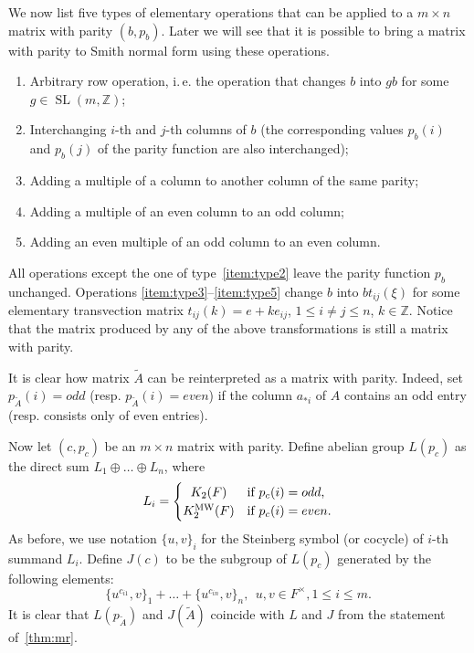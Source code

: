 \documentclass[oneside, 10pt]{amsart}
\theoremstyle{plain}
\theoremstyle{remark}
\theoremstyle{definition}
\DeclareMathOperator{\SL}{SL}
\newcommand{\ZZ}{\mathbb{Z}}
\newcommand{\K}{K_2}
\newcommand{\Kmw}{K^{\mathrm{MW}}_2}
\begin{document}
We now list five types of elementary operations that can be applied to a $m \times n$ matrix with parity $(b, p_b)$.
Later we will see that it is possible to bring a matrix with parity to Smith normal form using these operations.
\begin{enumerate}
 \item \label{item:type1} Arbitrary row operation, i.\,e. the operation that changes $b$ into $gb$ for some $g \in \SL(m, \ZZ)$;
 \item \label{item:type2} Interchanging $i$-th and $j$-th columns of $b$ 
  (the corresponding values $p_b(i)$ and $p_b(j)$ of the parity function are also interchanged);
 \item \label{item:type3} Adding a multiple of a column to another column of the same parity;
 \item \label{item:type4} Adding a multiple of an even column to an odd column;
 \item \label{item:type5} Adding an even multiple of an odd column to an even column.
\end{enumerate}
All operations except the one of type~\eqref{item:type2} leave the parity function $p_b$ unchanged.
Operations \eqref{item:type3}--\eqref{item:type5} change $b$ into $bt_{ij}(\xi)$
 for some elementary transvection matrix $t_{ij}(k) =e+k e_{ij}$, $1\leq i\neq j\leq n$, $k \in \ZZ$.
Notice that the matrix produced by any of the above transformations is still a matrix with parity.

It is clear how matrix $\widetilde{A}$ can be reinterpreted as a matrix with parity.
Indeed, set $p_{\widetilde{A}}(i) = odd$ (resp. $p_{\widetilde{A}}(i) = even$) if the column $a_{*i}$ of
 $A$ contains an odd entry (resp. consists only of even entries).

Now let $(c, p_c)$ be an $m\times n$ matrix with parity.
Define abelian group $L(p_c)$ as the direct sum $L_1 \oplus \ldots \oplus L_n$, where 
\[L_i=\left\{\def\arraystretch{1.2}%
  \begin{array}{@{}c@{\quad}l@{}}
     \K(F) & \text{if $p_c(i) = odd$,} \\    
     \Kmw(F) & \text{if $p_c(i) = even$}.
  \end{array}\right.\]
As before, we use notation $\{u, v\}_i$ for the Steinberg symbol (or cocycle) of $i$-th summand $L_i$.
Define $J(c)$ to be the subgroup of $L(p_c)$ generated by the following elements:
\[ \{ u^{c_{i1}}, v\}_1 + \ldots + \{u^{c_{in}}, v\}_{n},\ \ u, v\in F^\times, 1\leq i \leq m.\]
It is clear that $L(p_{\widetilde{A}})$ and $J({\widetilde{A}})$ coincide with $L$ and $J$ from the statement of~\cref{thm:mr}.
\end{document}
